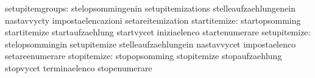                  setupitemgroups: stelopsommingenin                setupitemizations
                                  stelleaufzaehlungenein           nastavvycty
                                  impostaelencazioni               setareitemization
                    startitemize: startopsomming                   startitemize
                                  startaufzaehlung                 startvycet
                                  iniziaelenco                     startenumerare
                    setupitemize: stelopsommingin                  setupitemize
                                  stelleaufzaehlungein             nastavvycet
                                  impostaelenco                    setareenumerare
                     stopitemize: stopopsomming                    stopitemize
                                  stopaufzaehlung                  stopvycet
                                  terminaelenco                    stopenumerare


